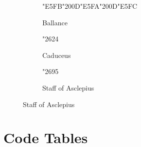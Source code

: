 \documentclass[letterpaper]{article}
\newcommand{\samplefigure}[1]{{\fontsize{48}{48}\samplefont#1}}
\newcommand{\samplefigureother}[1]{{\fontsize{48}{48}\othersamplefont#1}}
\begin{document}
\begin{figure}
  \begin{subfigure}{15em}
    \centering
    \caption{Ballance}
    \samplefigure{\char"E5FB\char"200D\char"E5FA\char"200D\char"E5FC}
  \end{subfigure}
  \begin{subfigure}{15em}
    \centering
    \caption{Caduceus}
    \samplefigureother{\char"2624}
  \end{subfigure}
  \begin{subfigure}{15em}
    \centering
    \caption{Staff of Asclepius}
    \samplefigureother{\char"2695}
  \end{subfigure}
\end{figure}


\section{Code Tables}
\end{document}
